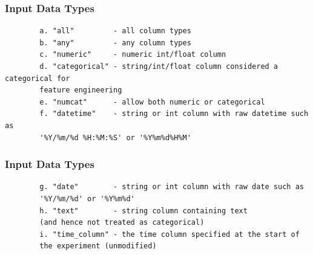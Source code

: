 \documentclass[11pt,
               aspectratio=169,
               hyperref={colorlinks}
               ]{beamer}
\begin{document}
	\begin{frame}[fragile]
		\frametitle{Input Data Types}
		\begin{verbatim}
		a. "all"         - all column types
		b. "any"         - any column types
		c. "numeric"     - numeric int/float column
		d. "categorical" - string/int/float column considered a categorical for 
		feature engineering
		e. "numcat"      - allow both numeric or categorical
		f. "datetime"    - string or int column with raw datetime such as 
		'%Y/%m/%d %H:%M:%S' or '%Y%m%d%H%M'
		\end{verbatim}
\end{frame}
	\begin{frame}[fragile]
		\frametitle{Input Data Types}
		\begin{verbatim}
		g. "date"        - string or int column with raw date such as 
		'%Y/%m/%d' or '%Y%m%d'
		h. "text"        - string column containing text 
		(and hence not treated as categorical)
		i. "time_column" - the time column specified at the start of 
		the experiment (unmodified)
		\end{verbatim}
\end{frame}
\end{document}
